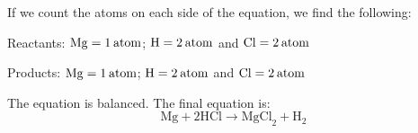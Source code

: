{\begin{mdframed}[linewidth=4, leftmargin=40, rightmargin=40]
\begin{exercise}
\begin{enumerate}[noitemsep, label=\textbf{Step} \textbf{\arabic*}. ]
        \label{m38726*id63970}If we count the atoms on each side of the equation, we find the following:\par 
        \label{m38726*id63974}Reactants: $\mathrm{Mg}=1\phantom{\rule{2pt}{0ex}}\mathrm{atom}$; $\mathrm{H}=2\phantom{\rule{2pt}{0ex}}\mathrm{atom}$ and $\mathrm{Cl}=2\phantom{\rule{2pt}{0ex}}\mathrm{atom}$\par 
        \label{m38726*id63977}Products: $\mathrm{Mg}=1\phantom{\rule{2pt}{0ex}}\mathrm{atom}$; $\mathrm{H}=2\phantom{\rule{2pt}{0ex}}\mathrm{atom}$ and $\mathrm{Cl}=2\phantom{\rule{2pt}{0ex}}\mathrm{atom}$\par 
        \label{m38726*id63981}The equation is balanced. The final equation is:
        \label{m38726*id643712}\nopagebreak\noindent{} 
    \begin{equation}
    \mathrm{Mg}+2\mathrm{HCl}\to {\mathrm{MgCl}}_{2}+{\mathrm{H}}_{2}\tag{13.8}
      \end{equation}
        \par 
 \end{enumerate}
    \end{exercise}
    \end{mdframed}
    }
    \noindent
\par
            \label{m38726*secfhsst!!!underscore!!!id394}\vspace{.5cm} 
      \noindent

